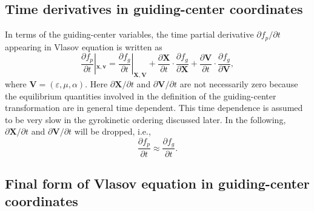 \documentclass{article}
\newcommand{\nobracket}{}
\begin{document}
\subsection{Time derivatives in guiding-center coordinates}

In terms of the guiding-center variables, the time partial derivative
$\partial f_p / \partial t$ appearing in Vlasov equation is written as
\begin{equation}
  \frac{\partial f_p}{\partial t} |_{\mathbf{x}, \mathbf{v}} \nobracket =
  \frac{\partial f_g}{\partial t} |_{\mathbf{X}, \mathbf{V}} \nobracket +
  \frac{\partial \mathbf{X}}{\partial t} \cdot \frac{\partial f_g}{\partial
  \mathbf{X}} + \frac{\partial \mathbf{V}}{\partial t} \cdot \frac{\partial
  f_g}{\partial \mathbf{V}},
\end{equation}
where $\mathbf{V}= (\varepsilon, \mu, \alpha)$. Here $\partial \mathbf{X}/
\partial t$ and $\partial \mathbf{V}/ \partial t$ are not necessarily zero
because the equilibrium quantities involved in the definition of the
guiding-center transformation are in general time dependent. This time
dependence is assumed to be very slow in the gyrokinetic ordering discussed
later. In the following, $\partial \mathbf{X}/ \partial t$ and $\partial
\mathbf{V}/ \partial t$ will be dropped, i.e.,
\begin{equation}
  \frac{\partial f_p}{\partial t} \approx \frac{\partial f_g}{\partial t} .
\end{equation}

\subsection{Final form of Vlasov equation in guiding-center coordinates}
\end{document}
